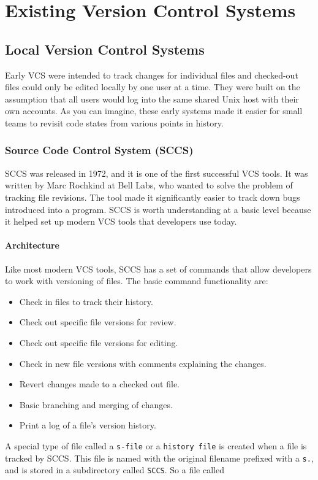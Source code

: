 \section{Existing Version Control Systems}
\subsection{Local Version Control Systems}
Early VCS were intended to track changes for individual files and checked-out files could only be edited locally by one user at a time. They were built on the assumption that all users would log into the same shared Unix host with their own accounts. As you can imagine, these early systems made it easier for small teams to revisit code states from various points in history.
\subsubsection{Source Code Control System (SCCS)}
SCCS was released in 1972, and it is one of the first successful VCS tools. It was written by Marc Rochkind at Bell Labs, who wanted to solve the problem of tracking file revisions. The tool made it significantly easier to track down bugs introduced into a program. SCCS is worth understanding at a basic level because it helped set up modern VCS tools that developers use today.
\paragraph{Architecture}
Like most modern VCS tools, SCCS has a set of commands that allow developers to work with versioning of files. The basic command functionality are:
\begin{itemize}
\item Check in files to track their history.
\item Check out specific file versions for review.
\item Check out specific file versions for editing.
\item Check in new file versions with comments explaining the changes.
\item Revert changes made to a checked out file.
\item Basic branching and merging of changes.
\item Print a log of a file's version history.
\end{itemize}
A special type of file called a \lstinline{s-file} or a \lstinline{history file} is created when a file is tracked by SCCS. This file is named with the original filename prefixed with a \lstinline{s.}, and is stored in a subdirectory called \lstinline{SCCS}. So a file called
